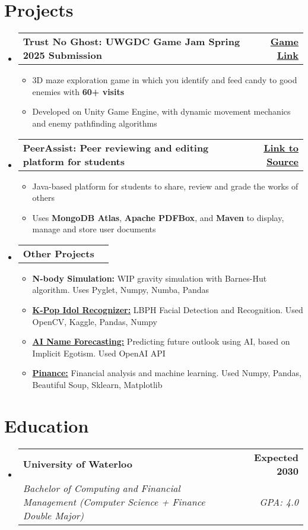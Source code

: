 \documentclass[letterpaper,11pt]{article}
\makeatletter
\newcommand{\resumeItem}[1]{
  \item\small{
    {#1 \vspace{-2pt}}
  }
}
\newcommand{\resumeSubheading}[4]{
  \vspace{-2pt}\item
    \begin{tabular*}{1.0\textwidth}[t]{l@{\extracolsep{\fill}}r}
      \textbf{#1} & \textbf{\small #2} \\
      \textit{\small#3} & \textit{\small #4} \\
    \end{tabular*}\vspace{-7pt}
}
\newcommand{\resumeProjectHeading}[2]{
    \item
    \begin{tabular*}{1.001\textwidth}{l@{\extracolsep{\fill}}r}
      \small#1 & \textbf{\small #2}\\
    \end{tabular*}\vspace{-7pt}
}
\newcommand{\resumeSubHeadingListStart}{\begin{itemize}[leftmargin=0.0in, label={}]}
\newcommand{\resumeSubHeadingListEnd}{\end{itemize}}
\newcommand{\resumeItemListStart}{\begin{itemize}}
\newcommand{\resumeItemListEnd}{\end{itemize}\vspace{-5pt}}
\makeatother
\begin{document}
\section{Projects}
\vspace{-5pt}
\resumeSubHeadingListStart
    \resumeProjectHeading{\textbf{Trust No Ghost: UWGDC Game Jam Spring 2025 Submission}}{\href{https://ianleung12.itch.io/trust-no-ghost}{\underline{Game Link}}}
    \resumeItemListStart
        \resumeItem{3D maze exploration game in which you identify and feed candy to good enemies with \textbf{60+ visits}}
        \resumeItem{Developed on Unity Game Engine,  with dynamic movement mechanics and enemy pathfinding algorithms}
    \resumeItemListEnd
    \vspace{-18pt}
    \resumeProjectHeading{\textbf{PeerAssist: Peer reviewing and editing platform for students }}{\href{https://github.com/IanLeung12/PeerAssist}{\underline{Link to Source}}}
    \resumeItemListStart
        \resumeItem{Java-based platform for students to share, review and grade the works of others}
        \resumeItem{Uses \textbf{MongoDB Atlas}, \textbf{Apache PDFBox}, and \textbf{Maven }to display, manage and store user documents}
    \resumeItemListEnd
    \vspace{-18pt}
    \resumeProjectHeading{\textbf{Other Projects}}{}
    \resumeItemListStart
        \resumeItem{\textbf{N-body Simulation:} WIP gravity simulation with Barnes-Hut algorithm. Uses Pyglet, Numpy, Numba, Pandas}
        \resumeItem{\href{https://github.com/IanLeung12/ai-skill-showcase}{\textbf{K-Pop Idol Recognizer:}} LBPH Facial Detection and Recognition. Used OpenCV, Kaggle, Pandas, Numpy}
        \resumeItem{\href{https://github.com/IanLeung12/AI-Name-Forecasting}{\textbf{AI Name Forecasting:}} Predicting future outlook using AI, based on Implicit Egotism. Used OpenAI API}
        \resumeItem{\href{https://github.com/IanLeung12/Pinance}{\textbf{Pinance:}} Financial analysis and machine learning. Used Numpy, Pandas, Beautiful Soup, Sklearn, Matplotlib}
    \resumeItemListEnd
    \vspace{-15pt}
    
\resumeSubHeadingListEnd
\vspace{-1pt}

\section{Education}
\resumeSubHeadingListStart
\resumeSubheading
{University of Waterloo}{Expected 2030} 
{Bachelor of Computing and Financial Management (Computer Science + Finance Double Major)}{GPA: 4.0}
\resumeSubHeadingListEnd
\vspace{-10pt}
\end{document}
